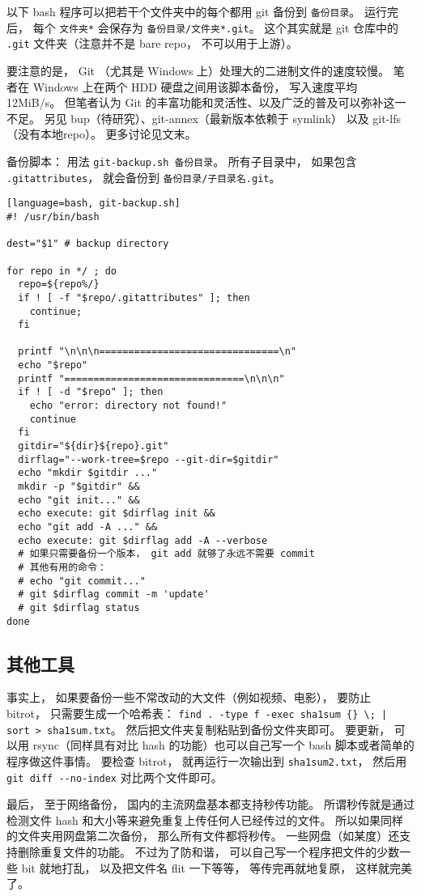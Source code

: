 
\begin{issues}
\issueDraft
\end{issues}


以下 bash 程序可以把若干个文件夹中的每个都用 git 备份到 \verb|备份目录|。 运行完后， 每个 \verb|文件夹*| 会保存为 \verb|备份目录/文件夹*.git|。 这个其实就是 git 仓库中的 \verb|.git| 文件夹（注意并不是 bare repo， 不可以用于上游）。

要注意的是， Git （尤其是 Windows 上）处理大的二进制文件的速度较慢。 笔者在 Windows 上在两个 HDD 硬盘之间用该脚本备份， 写入速度平均 12MiB/s。 但笔者认为 Git 的丰富功能和灵活性、以及广泛的普及可以弥补这一不足。 另见 bup（待研究）、git-annex（最新版本依赖于 symlink） 以及 git-lfs（没有本地repo）。 更多讨论见文末。

备份脚本： 用法 \verb|git-backup.sh 备份目录|。 所有子目录中， 如果包含 \verb|.gitattributes|， 就会备份到 \verb|备份目录/子目录名.git|。
\begin{lstlisting}[language=bash, git-backup.sh]
#! /usr/bin/bash

dest="$1" # backup directory

for repo in */ ; do
  repo=${repo%/}
  if ! [ -f "$repo/.gitattributes" ]; then
    continue;
  fi

  printf "\n\n\n===============================\n"
  echo "$repo"
  printf "===============================\n\n\n"
  if ! [ -d "$repo" ]; then
    echo "error: directory not found!"
    continue
  fi
  gitdir="${dir}${repo}.git"
  dirflag="--work-tree=$repo --git-dir=$gitdir"
  echo "mkdir $gitdir ..."
  mkdir -p "$gitdir" &&
  echo "git init..." &&
  echo execute: git $dirflag init &&
  echo "git add -A ..." &&
  echo execute: git $dirflag add -A --verbose
  # 如果只需要备份一个版本， git add 就够了永远不需要 commit
  # 其他有用的命令：
  # echo "git commit..."
  # git $dirflag commit -m 'update'
  # git $dirflag status
done
\end{lstlisting}

\subsection{其他工具}
事实上， 如果要备份一些不常改动的大文件（例如视频、电影）， 要防止 bitrot， 只需要生成一个哈希表： \verb`find . -type f -exec sha1sum {} \; | sort > sha1sum.txt`。 然后把文件夹复制粘贴到备份文件夹即可。 要更新， 可以用 rsync（同样具有对比 hash 的功能）也可以自己写一个 bash 脚本或者简单的程序做这件事情。 要检查 bitrot， 就再运行一次输出到 \verb|sha1sum2.txt|， 然后用 \verb|git diff --no-index| 对比两个文件即可。

最后， 至于网络备份， 国内的主流网盘基本都支持秒传功能。 所谓秒传就是通过检测文件 hash 和大小等来避免重复上传任何人已经传过的文件。 所以如果同样的文件夹用网盘第二次备份， 那么所有文件都将秒传。 一些网盘（如某度）还支持删除重复文件的功能。 不过为了防和谐， 可以自己写一个程序把文件的少数一些 bit 就地打乱， 以及把文件名 flit 一下等等， 等传完再就地复原， 这样就完美了。
